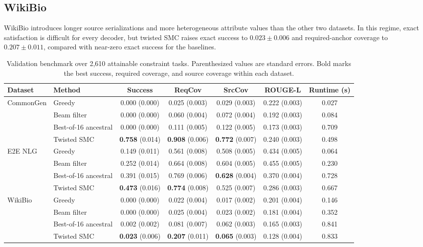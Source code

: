 \documentclass[11pt]{article}
\begin{document}
\subsection{WikiBio}
WikiBio introduces longer source serializations and more heterogeneous attribute values than the other two datasets. In this regime, exact satisfaction is difficult for every decoder, but twisted SMC raises exact success to $0.023\pm0.006$ and required-anchor coverage to $0.207\pm0.011$, compared with near-zero exact success for the baselines.

\begin{table}[H]
\centering
\footnotesize
\caption{Validation benchmark over 2{,}610 attainable constraint tasks. Parenthesized values are standard errors. Bold marks the best success, required coverage, and source coverage within each dataset.}
\label{tab:main-results}
\begin{tabular}{llccccc}
\toprule
Dataset & Method & Success & ReqCov & SrcCov & ROUGE-L & Runtime (s) \\
\midrule
\multirow{4}{*}{CommonGen}
& Greedy & 0.000 (0.000) & 0.025 (0.003) & 0.029 (0.003) & 0.222 (0.003) & 0.027 \\
& Beam filter & 0.000 (0.000) & 0.060 (0.004) & 0.072 (0.004) & 0.192 (0.003) & 0.084 \\
& Best-of-16 ancestral & 0.000 (0.000) & 0.111 (0.005) & 0.122 (0.005) & 0.173 (0.003) & 0.709 \\
& Twisted SMC & \textbf{0.758} (0.014) & \textbf{0.908} (0.006) & \textbf{0.772} (0.007) & 0.240 (0.003) & 0.498 \\
\midrule
\multirow{4}{*}{E2E NLG}
& Greedy & 0.149 (0.011) & 0.561 (0.008) & 0.508 (0.005) & 0.434 (0.005) & 0.064 \\
& Beam filter & 0.252 (0.014) & 0.664 (0.008) & 0.604 (0.005) & 0.455 (0.005) & 0.230 \\
& Best-of-16 ancestral & 0.391 (0.015) & 0.769 (0.006) & \textbf{0.628} (0.004) & 0.370 (0.004) & 0.728 \\
& Twisted SMC & \textbf{0.473} (0.016) & \textbf{0.774} (0.008) & 0.525 (0.007) & 0.286 (0.003) & 0.667 \\
\midrule
\multirow{4}{*}{WikiBio}
& Greedy & 0.000 (0.000) & 0.022 (0.004) & 0.017 (0.002) & 0.201 (0.004) & 0.146 \\
& Beam filter & 0.000 (0.000) & 0.025 (0.004) & 0.023 (0.002) & 0.181 (0.004) & 0.352 \\
& Best-of-16 ancestral & 0.002 (0.002) & 0.081 (0.007) & 0.062 (0.003) & 0.165 (0.003) & 0.841 \\
& Twisted SMC & \textbf{0.023} (0.006) & \textbf{0.207} (0.011) & \textbf{0.065} (0.003) & 0.128 (0.004) & 0.833 \\
\bottomrule
\end{tabular}
\end{table}
\end{document}
